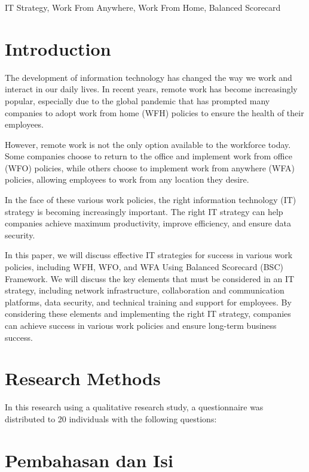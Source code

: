 \documentclass[conference]{IEEEtran}
\begin{document}
\begin{IEEEkeywords}
IT Strategy, Work From Anywhere, Work From Home, Balanced Scorecard
\end{IEEEkeywords}

\section{Introduction}
The development of information technology has changed the way we work and interact in our daily lives. In recent years, remote work has become increasingly popular, especially due to the global pandemic that has prompted many companies to adopt work from home (WFH) policies to ensure the health of their employees.

However, remote work is not the only option available to the workforce today. Some companies choose to return to the office and implement work from office (WFO) policies, while others choose to implement work from anywhere (WFA) policies, allowing employees to work from any location they desire.

In the face of these various work policies, the right information technology (IT) strategy is becoming increasingly important. The right IT strategy can help companies achieve maximum productivity, improve efficiency, and ensure data security.

In this paper, we will discuss effective IT strategies for success in various work policies, including WFH, WFO, and WFA Using Balanced Scorecard (BSC) Framework. We will discuss the key elements that must be considered in an IT strategy, including network infrastructure, collaboration and communication platforms, data security, and technical training and support for employees. By considering these elements and implementing the right IT strategy, companies can achieve success in various work policies and ensure long-term business success.

\section{Research Methods}

In this research using a qualitative research study, a questionnaire was distributed to 20 individuals with the following questions:

\section{Pembahasan dan Isi}
\end{document}
